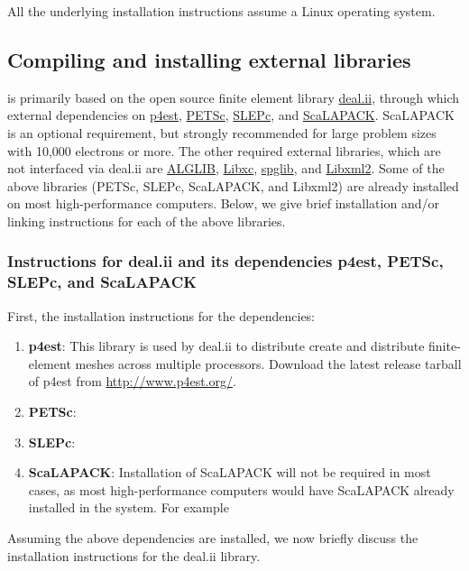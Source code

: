 All the underlying installation instructions assume a Linux operating system.
\subsection{Compiling and installing external libraries}
\dftfe{} is primarily based on the open source finite element library \href{http://www.dealii.org/}{deal.ii}, through which external dependencies
on \href{http://p4est.org/}{p4est}, \href{https://www.mcs.anl.gov/petsc/}{PETSc}, \href{http://slepc.upv.es/}{SLEPc}, and \href{http://www.netlib.org/scalapack/}{ScaLAPACK}. ScaLAPACK is an optional requirement, but strongly recommended for large problem sizes with 10,000 electrons or more. The other required external libraries, which are
not interfaced via deal.ii are \href{http://www.alglib.net/}{ALGLIB}, \href{http://www.tddft.org/programs/libxc/}{Libxc}, \href{https://atztogo.github.io/spglib/}{spglib}, and \href{http://www.xmlsoft.org/}{Libxml2}. Some of the above libraries (PETSc, SLEPc, ScaLAPACK, and Libxml2) are already installed on most high-performance computers. Below, we give brief installation and/or linking instructions for each of the above libraries.

\subsubsection{Instructions for deal.ii and its dependencies p4est, PETSc, SLEPc, and ScaLAPACK}
First, the installation instructions for the dependencies:
\begin{enumerate}
	\item   {\bf p4est}: This library is used by deal.ii to distribute create and distribute finite-element meshes across multiple processors. Download the latest release tarball of p4est from \url{http://www.p4est.org/}. 

\item {\bf PETSc}: 

\item {\bf SLEPc}:

\item {\bf ScaLAPACK}: Installation of ScaLAPACK will not be required in most cases, as most high-performance computers would have ScaLAPACK already installed in the system. For example 	
\end{enumerate}

Assuming the above dependencies are installed, we now briefly discuss the installation instructions for the deal.ii library.

